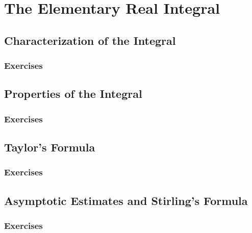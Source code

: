 \setcounter{chapter}{0}
\renewcommand{\thechapter}{5}
\chapter{The Elementary Real Integral}\label{ch:5}
\setcounter{equation}{0}	        %

\section{Characterization of the Integral}\label{sec:5.1}
\subsection*{Exercises}\label{sec:5.1_Exercises}
\section{Properties of the Integral}\label{sec:5.2}	
\subsection*{Exercises}\label{sec:5.2_Exercises}
\section{Taylor's Formula}\label{sec:5.3}	
\subsection*{Exercises}\label{sec:5.3_Exercises}
\section{Asymptotic Estimates and Stirling's Formula}\label{sec:5.4}	
\subsection*{Exercises}\label{sec:5.4_Exercises}
